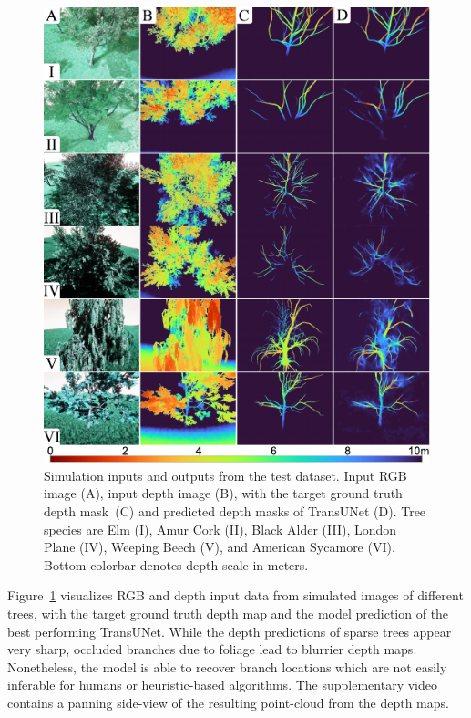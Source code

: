 \begin{figure}[!t]
    \centering
    \includegraphics[width=1\columnwidth]{figures/fig-4-qualitative-sim/fig-4-qualitative-sim-v05.pdf}
    \vspace{\figurevspaceabove}
    \caption{Simulation inputs and outputs from the test dataset. Input RGB image (A), input depth image (B), with the target ground truth depth \mbox{mask (C)} and predicted depth masks of TransUNet (D). Tree species are Elm (I), Amur Cork (II),  Black Alder (III), London Plane (IV), Weeping Beech (V), and American Sycamore (VI). Bottom colorbar denotes depth scale in meters.}
    \label{fig-4-qualitative-sim}
    \vspace{\figurevspacebelow}
\end{figure}


Figure~\ref{fig-4-qualitative-sim} visualizes RGB and depth input data from simulated images of different trees, with the target ground truth depth map and the model prediction  of the best performing TransUNet. While the depth predictions of sparse trees appear very sharp, occluded branches due to foliage lead to blurrier depth maps. Nonetheless, the model is able to recover branch locations which are not easily inferable for humans or heuristic-based algorithms. The supplementary video contains a panning side-view of the resulting point-cloud from the depth maps.


